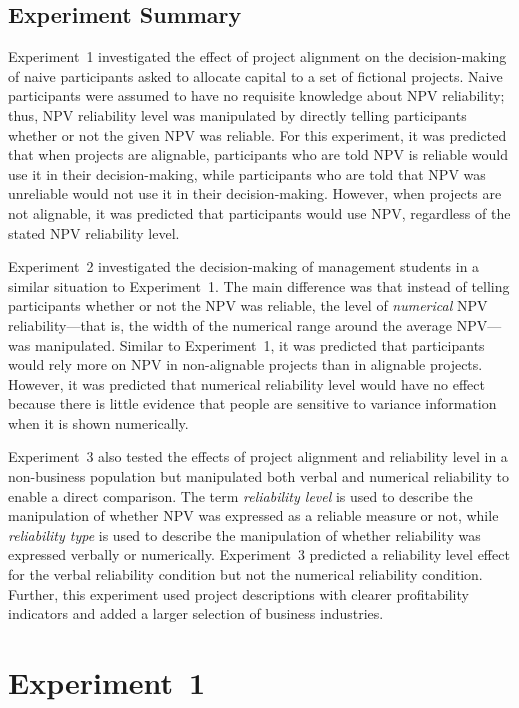 \documentclass[
  english,
  man, donotrepeattitle,floatsintext]{apa7}
\theoremstyle{definition}
\theoremstyle{definition}
\theoremstyle{definition}
\theoremstyle{definition}
\theoremstyle{remark}
\begin{document}
\hypertarget{experiment-summary}{%
\subsection{Experiment Summary}\label{experiment-summary}}

Experiment~1 investigated the effect of project alignment on the decision-making
of naive participants asked to allocate capital to a set of fictional projects.
Naive participants were assumed to have no requisite knowledge about NPV
reliability; thus, NPV reliability level was manipulated by directly telling
participants whether or not the given NPV was reliable. For this experiment, it
was predicted that when projects are alignable, participants who are told NPV is
reliable would use it in their decision-making, while participants who are told
that NPV was unreliable would not use it in their decision-making. However, when
projects are not alignable, it was predicted that participants would use NPV,
regardless of the stated NPV reliability level.

Experiment~2 investigated the decision-making of management students in a
similar situation to Experiment~1. The main difference was that instead of
telling participants whether or not the NPV was reliable, the level of
\emph{numerical} NPV reliability---that is, the width of the numerical range around
the average NPV---was manipulated. Similar to Experiment~1, it was predicted
that participants would rely more on NPV in non-alignable projects than in
alignable projects. However, it was predicted that numerical reliability level
would have no effect because there is little evidence that people are sensitive
to variance information when it is shown numerically.

Experiment~3 also tested the effects of project alignment and reliability level
in a non-business population but manipulated both verbal and numerical
reliability to enable a direct comparison. The term \emph{reliability level} is used
to describe the manipulation of whether NPV was expressed as a reliable measure
or not, while \emph{reliability type} is used to describe the manipulation of whether
reliability was expressed verbally or numerically. Experiment~3 predicted a
reliability level effect for the verbal reliability condition but not the
numerical reliability condition. Further, this experiment used project
descriptions with clearer profitability indicators and added a larger selection
of business industries.

\hypertarget{alignment-2}{%
\section{Experiment~1}\label{alignment-2}}
\end{document}

